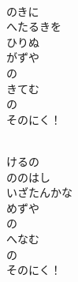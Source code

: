 \documentclass[10pt,b5j]{tarticle} %
\begin{document}
\vspace{1.5em} %
\newcommand{\linespace}{0.5em} %
\newcommand{\blocksize}{0.5\hsize} %
\newcommand{\itemmargin}{3em} %
\begin{enumerate} %
    \setlength{\itemindent}{\itemmargin} %
    \begin{minipage}[c]{\blocksize}
    
        \vspace{\linespace}
        \item~\\
        のきに\\
        へたるきを\\
        ひりぬ\\
        がずや\\
        の\\
        きてむ\\
        の\\
        そのにく！
        
    \end{minipage}
    \begin{minipage}[c]{\blocksize}
        
        \vspace{\linespace}
        \item~\\
        けるの\\
        ののはし\\
        いざたんかな\\
        めずや\\
        の\\
        へなむ\\
        の\\
        そのにく！
        
    \end{minipage}
    \begin{minipage}[c]{\blocksize}
        

\end{minipage}
\end{enumerate}
\end{document}
